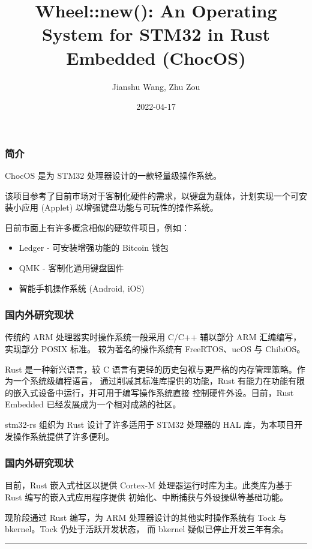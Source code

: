 \documentclass[aspectratio=169]{beamer}
\title{Wheel::new(): An Operating System for STM32 in Rust Embedded (ChocOS)}
\author{Jianshu Wang, Zhu Zou}
\date{2022-04-17}
\begin{document}
\maketitle

\begin{frame}
    \frametitle{简介}
    ChocOS 是为 STM32 处理器设计的一款轻量级操作系统。
    \par
    该项目参考了目前市场对于客制化硬件的需求，以键盘为载体，计划实现一个可安装小应用 (Applet) 
    以增强键盘功能与可玩性的操作系统。
    \par
    目前市面上有许多概念相似的硬软件项目，例如：
    \begin{itemize}
        \item Ledger - 可安装增强功能的 Bitcoin 钱包
        \item QMK - 客制化通用键盘固件
        \item 智能手机操作系统 (Android, iOS)
    \end{itemize}
\end{frame}

\begin{frame}
    \frametitle{国内外研究现状}

    传统的 ARM 处理器实时操作系统一般采用 C/C++ 辅以部分 ARM 汇编编写，实现部分 POSIX 标准。
    较为著名的操作系统有 FreeRTOS、ucOS 与 ChibiOS。
    \par
    Rust 是一种新兴语言，较 C 语言有更轻的历史包袱与更严格的内存管理策略。作为一个系统级编程语言，
    通过削减其标准库提供的功能，Rust 有能力在功能有限的嵌入式设备中运行，并可用于编写操作系统直接
    控制硬件外设。目前，Rust Embedded 已经发展成为一个相对成熟的社区。
    \par
    stm32-rs 组织为 Rust 设计了许多适用于 STM32 处理器的 HAL 库，为本项目开发操作系统提供了许多便利。

\end{frame}

\begin{frame}
    \frametitle{国内外研究现状}

    目前，Rust 嵌入式社区以提供 Cortex-M 处理器运行时库为主。此类库为基于 Rust 编写的嵌入式应用程序提供
    初始化、中断捕获与外设操纵等基础功能。
    \par
    现阶段通过 Rust 编写，为 ARM 处理器设计的其他实时操作系统有 Tock\textsuperscript{\cite{levy17multiprogramming}} 与 bkernel。Tock 仍处于活跃开发状态，
    而 bkernel 疑似已停止开发三年有余。

    \par

    \vfill
    \noindent\rule{2cm}{0.4pt}
    \printbibliography

\end{frame}
\end{document}
